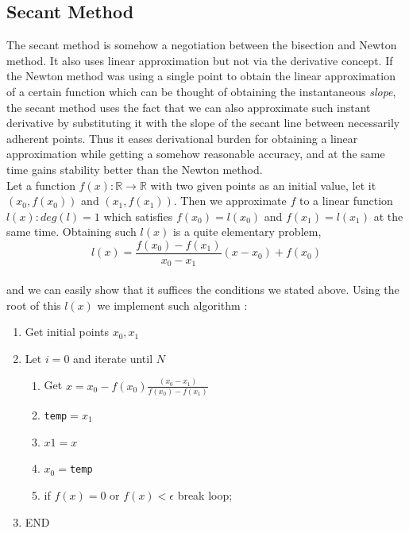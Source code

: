 \documentclass[paper=a4, fontsize=11pt]{scrartcl}
\begin{document}
\subsection{Secant Method}
\vspace{0.15in}
The secant method is somehow a negotiation between the bisection and Newton method. It also uses linear approximation but not via the derivative concept. If the Newton method was using a single point to obtain the linear approximation of a certain function which can be thought of obtaining the instantaneous \textit{slope}, the secant method uses the fact that we can also approximate such instant derivative by substituting it with the slope of the secant line between necessarily adherent points. Thus it eases derivational burden for obtaining a linear approximation while getting a somehow reasonable accuracy, and at the same time gains stability better than the Newton method. \\

Let a function $f(x):\mathbb{R}\to\mathbb{R}$ with two given points as an initial value, let it $(x_0,f(x_0))$ and $(x_1, f(x_1))$. Then we approximate $f$ to a linear function $l(x): deg(l)=1$ which satisfies $f(x_0)=l(x_0)$ and $f(x_1)=l(x_1)$ at the same time. Obtaining such $l(x)$ is a quite elementary problem, \\

\begin{equation}\nonumber
	l(x) = \frac{f(x_0)-f(x_1)}{x_0 - x_1}(x-x_0)+ f(x_0)
\end{equation}\\

and we can easily show that it suffices the conditions we stated above. Using the root of this $l(x)$ we implement such algorithm :

\begin{enumerate}[label=\arabic*)]
	\item Get initial points $x_0,x_1$
	\item Let $i=0$ and iterate until $N$
	\begin{enumerate}[label=(\arabic*)]
		\item Get $x = x_0 - f(x_0)\frac{(x_0-x_1)}{f(x_0)-f(x_1)}$
		\item \texttt{temp}$= x_1$
		\item $x1=x$
		\item $x_0=$\texttt{temp}
		\item if $f(x)=0$ or $f(x) < \epsilon$ break loop;
	\end{enumerate}
	\item END
\end{enumerate} 
\end{document}
